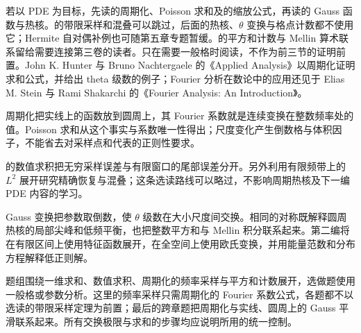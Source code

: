 \ProseParagraphBreak

若以 PDE 为目标，先读的周期化、Poisson 求和及的缩放公式，再读的 Gauss 函数与热核。的带限采样和混叠可以跳过，后面的热核、\(\theta\) 变换与格点计数都不使用它；Hermite 自对偶补例也可随第五章专题暂缓。的平方和计数与 Mellin 算术联系留给需要连接第三卷的读者。只在需要一般格时阅读，不作为前三节的证明前置。John K. Hunter 与 Bruno Nachtergaele 的《Applied Analysis》\cite[Section 11.11, p. 319]{Hunter2001Applied}以周期化证明求和公式，并给出 theta 级数的例子；Fourier 分析在数论中的应用还见于 Elias M. Stein 与 Rami Shakarchi 的《Fourier Analysis: An Introduction》\cite{Stein2003Fourier}。






\begin{chaptersummary}
周期化把实线上的函数放到圆周上，其 Fourier 系数就是连续变换在整数频率处的值。Poisson 求和从这个事实与系数唯一性得出；尺度变化产生倒数格与体积因子，不能省去对采样点和代表的正则性要求。

\ProseParagraphBreak

的数值求积把无穷采样误差与有限窗口的尾部误差分开。另外利用有限频带上的 \(L^2\) 展开研究精确恢复与混叠；这条选读路线可以略过，不影响周期热核及下一编 PDE 内容的学习。

\ProseParagraphBreak

Gauss 变换把参数取倒数，使 \(\theta\) 级数在大小尺度间交换。相同的对称既解释圆周热核的局部尖峰和低频平衡，也把整数平方和与 Mellin 积分联系起来。第二编将在有限区间上使用特征函数展开，在全空间上使用欧氏变换，并用能量范数和分布方程解释低正则解。
\end{chaptersummary}

\BookExercises

题组围绕一维求和、数值求积、周期化的频率采样与平方和计数展开，选做题使用一般格或参数分析。这里的频率采样只需周期化的 Fourier 系数公式，各题都不以选读的带限采样定理为前置；最后的跨章题把周期化与实线、圆周上的 Gauss 平滑联系起来。所有交换极限与求和的步骤均应说明所用的统一控制。

